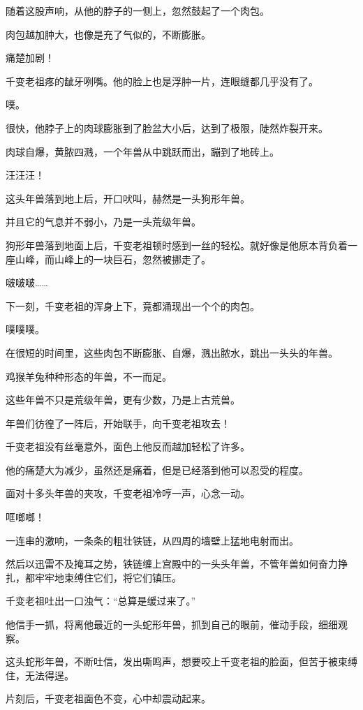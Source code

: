 \begin{this_body}
随着这股声响，从他的脖子的一侧上，忽然鼓起了一个肉包。

肉包越加肿大，也像是充了气似的，不断膨胀。

痛楚加剧！

千变老祖疼的龇牙咧嘴。他的脸上也是浮肿一片，连眼缝都几乎没有了。

噗。

很快，他脖子上的肉球膨胀到了脸盆大小后，达到了极限，陡然炸裂开来。

肉球自爆，黄脓四溅，一个年兽从中跳跃而出，蹦到了地砖上。

汪汪汪！

这头年兽落到地上后，开口吠叫，赫然是一头狗形年兽。

并且它的气息并不弱小，乃是一头荒级年兽。

狗形年兽落到地面上后，千变老祖顿时感到一丝的轻松。就好像是他原本背负着一座山峰，而山峰上的一块巨石，忽然被挪走了。

啵啵啵……

下一刻，千变老祖的浑身上下，竟都涌现出一个个的肉包。

噗噗噗。

在很短的时间里，这些肉包不断膨胀、自爆，溅出脓水，跳出一头头的年兽。

鸡猴羊兔种种形态的年兽，不一而足。

这些年兽不只是荒级年兽，更有少数，乃是上古荒兽。

年兽们彷徨了一阵后，开始联手，向千变老祖攻去！

千变老祖没有丝毫意外，面色上他反而越加轻松了许多。

他的痛楚大为减少，虽然还是痛着，但是已经落到他可以忍受的程度。

面对十多头年兽的夹攻，千变老祖冷哼一声，心念一动。

哐啷啷！

一连串的激响，一条条的粗壮铁链，从四周的墙壁上猛地电射而出。

然后以迅雷不及掩耳之势，铁链缠上宫殿中的一头头年兽，不管年兽如何奋力挣扎，都牢牢地束缚住它们，将它们镇压。

千变老祖吐出一口浊气：“总算是缓过来了。”

他信手一抓，将离他最近的一头蛇形年兽，抓到自己的眼前，催动手段，细细观察。

这头蛇形年兽，不断吐信，发出嘶鸣声，想要咬上千变老祖的脸面，但苦于被束缚住，无法得逞。

片刻后，千变老祖面色不变，心中却震动起来。


\end{this_body}
